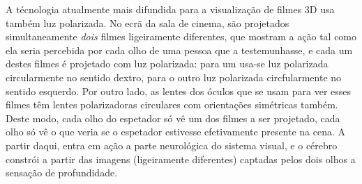 A técnologia atualmente mais difundida para a visualização de filmes 3D usa
também luz polarizada. No ecrã da sala de cinema, são projetados
simultaneamente \emph{dois} filmes ligeiramente diferentes, que mostram a ação
tal como ela seria percebida por cada olho de uma pessoa que a testemunhasse, e
cada um destes filmes é projetado com luz polarizada: para um usa-se luz
polarizada circularmente no sentido dextro, para o outro luz polarizada
circfularmente no sentido esquerdo. Por outro lado, as lentes dos óculos que se
usam para ver esses filmes têm lentes polarizadoras circulares com orientações
simétricas também.  Deste modo, cada olho do espetador só vê um dos filmes a ser
projetado, cada olho só vê o que veria se o espetador estivesse efetivamente
presente na cena. A partir daqui, entra em ação a parte neurológica do sistema
visual, e o cérebro constrói a partir das imagens (ligeiramente
diferentes) captadas pelos dois olhos a sensação de profundidade.

\newpage
